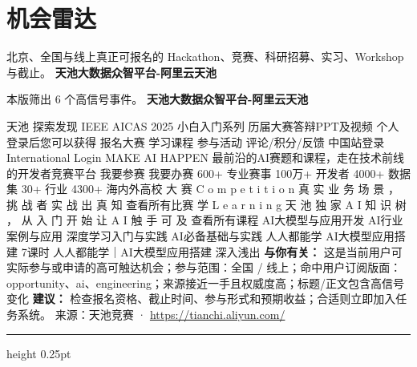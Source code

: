 \documentclass[10.5pt]{ctexart}
\begin{document}
\section*{机会雷达}
{\color{ormuted} 北京、全国与线上真正可报名的 Hackathon、竞赛、科研招募、实习、Workshop 与截止。}
\vspace{2mm}
{\LARGE\bfseries 天池大数据众智平台-阿里云天池}\par
\vspace{1mm}
{\color{ormuted} 本版筛出 6 个高信号事件。}
\vspace{3mm}
{\Large\bfseries 天池大数据众智平台-阿里云天池}\par
天池 探索发现 IEEE AICAS 2025 小白入门系列 历届大赛答辩PPT及视频 个人 登录后您可以获得 报名大赛 学习课程 参与活动 评论/积分/反馈 中国站登录 International Login MAKE AI HAPPEN 最前沿的AI赛题和课程，走在技术前线的开发者竞赛平台 我要参赛 我要办赛 600+ 专业赛事 100万+ 开发者 4000+ 数据集 30+ 行业 4300+ 海内外高校 大 赛 C o m p e t i t i o n 真 实 业 务 场 景 ， 挑 战 者 实 战 出 真 知 查看所有比赛 学 L e a r n i n g 天 池 独 家 A I 知 识 树 ， 从 入 门 开 始 让 A I 触 手 可 及 查看所有课程 AI大模型与应用开发 AI行业案例与应用 深度学习入门与实践 AI必备基础与实践 人人都能学 AI大模型应用搭建 7课时 人人都能学｜AI大模型应用搭建 深入浅出
\textbf{与你有关：} 这是当前用户可实际参与或申请的高可触达机会；参与范围：全国 / 线上；命中用户订阅版面：opportunity、ai、engineering；来源接近一手且权威度高；标题/正文包含高信号变化
\textbf{建议：} 检查报名资格、截止时间、参与形式和预期收益；合适则立即加入任务系统。
{\footnotesize\color{ormuted} 来源：天池竞赛 · \url{https://tianchi.aliyun.com/}}
\vspace{4mm}
\hrule height 0.25pt
\vspace{3mm}
\end{document}
